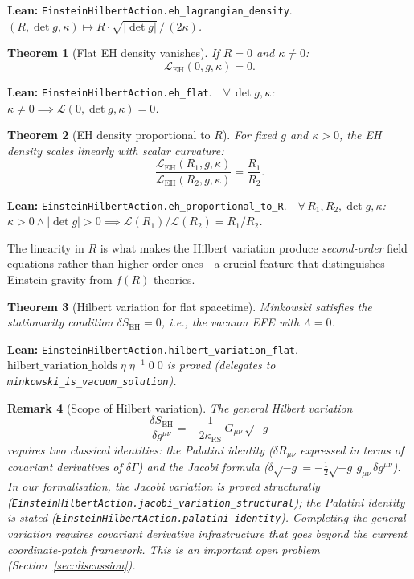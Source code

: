 \documentclass[11pt,a4paper]{article}
\newtheorem{theorem}{Theorem}[section]
\newtheorem{remark}[theorem]{Remark}
\newcommand{\kRS}{\kappa_{\mathrm{RS}}}
\newcommand{\lean}[1]{\texttt{#1}}
\newcommand{\leanref}[2]{\noindent\textbf{Lean:} \lean{#1}.\ \ \textit{#2}}
\begin{document}
\leanref{EinsteinHilbertAction.eh\_lagrangian\_density}{$(R, \det g, \kappa) \mapsto R \cdot \sqrt{|\det g|}\,/\,(2\kappa)$.}

\begin{theorem}[Flat EH density vanishes]
\label{thm:eh_flat}
If $R = 0$ and $\kappa \ne 0$:
\begin{equation}\label{eq:eh_flat}
\mathcal{L}_{\mathrm{EH}}(0, g, \kappa) = 0.
\end{equation}
\end{theorem}

\leanref{EinsteinHilbertAction.eh\_flat}{$\forall\,\det g,\kappa$: $\kappa \ne 0 \implies \mathcal{L}(0,\det g,\kappa) = 0$.}

\begin{theorem}[EH density proportional to $R$]
\label{thm:eh_prop}
For fixed $g$ and $\kappa > 0$, the EH density scales linearly with scalar curvature:
\begin{equation}\label{eq:eh_prop}
\frac{\mathcal{L}_{\mathrm{EH}}(R_1, g, \kappa)}{\mathcal{L}_{\mathrm{EH}}(R_2, g, \kappa)} = \frac{R_1}{R_2}.
\end{equation}
\end{theorem}

\leanref{EinsteinHilbertAction.eh\_proportional\_to\_R}{$\forall\,R_1,R_2,\det g,\kappa$: $\kappa > 0 \wedge |\det g| > 0 \implies \mathcal{L}(R_1)/\mathcal{L}(R_2) = R_1/R_2$.}

\noindent The linearity in $R$ is what makes the Hilbert variation produce \emph{second-order} field equations rather than higher-order ones---a crucial feature that distinguishes Einstein gravity from $f(R)$ theories.

\begin{theorem}[Hilbert variation for flat spacetime]
\label{thm:hilbert_flat}
Minkowski satisfies the stationarity condition $\delta S_{\mathrm{EH}} = 0$, i.e., the vacuum EFE with $\Lambda = 0$.
\end{theorem}

\leanref{EinsteinHilbertAction.hilbert\_variation\_flat}{$\mathrm{hilbert\_variation\_holds}\;\eta\;\eta^{-1}\;0\;0$ is proved (delegates to \lean{minkowski\_is\_vacuum\_solution}).}

\begin{remark}[Scope of Hilbert variation]
\label{rem:hilbert}
The general Hilbert variation
\[
\frac{\delta S_{\mathrm{EH}}}{\delta g^{\mu\nu}} = -\frac{1}{2\kRS}\,G_{\mu\nu}\,\sqrt{-g}
\]
requires two classical identities: the Palatini identity ($\delta R_{\mu\nu}$ expressed in terms of covariant derivatives of $\delta\Gamma$) and the Jacobi formula ($\delta\sqrt{-g} = -\tfrac{1}{2}\sqrt{-g}\,g_{\mu\nu}\,\delta g^{\mu\nu}$).
In our formalisation, the Jacobi variation is proved structurally (\lean{EinsteinHilbertAction.jacobi\_variation\_structural}); the Palatini identity is stated (\lean{EinsteinHilbertAction.palatini\_identity}).
Completing the general variation requires covariant derivative infrastructure that goes beyond the current coordinate-patch framework.
This is an important open problem (Section~\ref{sec:discussion}).
\end{remark}
\end{document}
